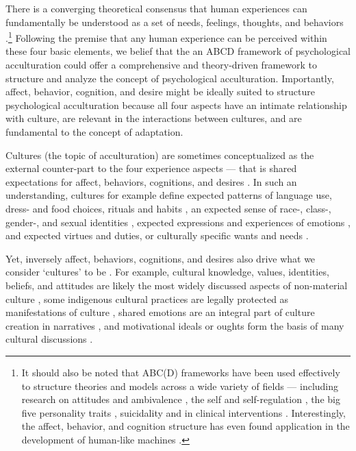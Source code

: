 \documentclass[man, 12pt, a4paper]{apa7}
\begin{document}
There is a converging theoretical consensus that human experiences can fundamentally be understood as a set of needs, feelings, thoughts, and behaviors \citep[sometimes referred to as the ABCs or ABCDs of psychology: affect, behavior, cognition, desire; e.g.,][]{Cottam2010, Hogg2005, Jhangiani2014}.\footnote{It should also be noted that ABC(D) frameworks have been used effectively to structure theories and models across a wide variety of fields --- including research on attitudes \citep{Breckler1984} and ambivalence \citep{VanHarreveld2015}, the self \citep{Cote2009} and self-regulation \citep{Ben-Eliyahu2015}, the big five personality traits \citep{Wilt2016}, suicidality \citep{Harris2015} and in clinical interventions \citep{Eifert1989}. Interestingly, the affect, behavior, and cognition structure has even found application in the development of human-like machines \citep{Guo2020}.} Following the premise that any human experience can be perceived within these four basic elements, we belief that the an ABCD framework of psychological acculturation could offer a comprehensive and theory-driven framework to structure and analyze the concept of psychological acculturation. Importantly, affect, behavior, cognition, and desire might be ideally suited to structure psychological acculturation because all four aspects have an intimate relationship with culture, are relevant in the interactions between cultures, and are fundamental to the concept of adaptation.

Cultures (the topic of acculturation) are sometimes conceptualized as the external counter-part to the four experience aspects --- that is shared expectations for affect, behaviors, cognitions, and desires \citep[][p. 52; on social facts]{Durkheim1982}. In such an understanding, cultures for example define expected patterns of language use, dress- and food choices, rituals and habits \citep[][]{Legare2019, Whiting1980, Hofstede2001}, an expected sense of race-, class-, gender-, and sexual identities \citep[][]{Gelfand2011, Nisbett2002}, expected expressions and experiences of emotions \citep[][]{Holodynski2012, Boiger2018}, and expected virtues and duties, or culturally specific wants and needs \citep[][]{McInerney2016, Morling2017}. 

Yet, inversely affect, behaviors, cognitions, and desires also drive what we consider `cultures' to be \citep[e.g.,][]{Varnum2017}. For example, cultural knowledge, values, identities, beliefs, and attitudes are likely the most widely discussed aspects of non-material culture \citep[e.g.,][]{DiMaggio1997}, some indigenous cultural practices are legally protected as manifestations of culture \citep[Art. 11]{UnitedNations2007}, shared emotions are an integral part of culture creation in narratives \citep[e.g.,][]{Ahmed2014, Kitayama1994, Smith2016c, Sundararajan2015}, and motivational ideals or oughts form the basis of many cultural discussions \citep[e.g., see][]{Markus1991}.
\end{document}
